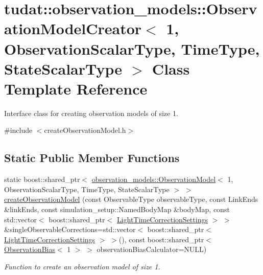 \hypertarget{classtudat_1_1observation__models_1_1ObservationModelCreator_3_011_00_01ObservationScalarType_000a796f0b9a7fff0a1600b7fb834d19c2}{}\section{tudat\+:\+:observation\+\_\+models\+:\+:Observation\+Model\+Creator$<$ 1, Observation\+Scalar\+Type, Time\+Type, State\+Scalar\+Type $>$ Class Template Reference}
\label{classtudat_1_1observation__models_1_1ObservationModelCreator_3_011_00_01ObservationScalarType_000a796f0b9a7fff0a1600b7fb834d19c2}


Interface class for creating observation models of size 1.  




{\ttfamily \#include $<$create\+Observation\+Model.\+h$>$}

\subsection*{Static Public Member Functions}
\begin{DoxyCompactItemize}
\item 
static boost\+::shared\+\_\+ptr$<$ \hyperlink{classtudat_1_1observation__models_1_1ObservationModel}{observation\+\_\+models\+::\+Observation\+Model}$<$ 1, Observation\+Scalar\+Type, Time\+Type, State\+Scalar\+Type $>$ $>$ \hyperlink{classtudat_1_1observation__models_1_1ObservationModelCreator_3_011_00_01ObservationScalarType_000a796f0b9a7fff0a1600b7fb834d19c2_ae9fd293adfe7dd20ebe6578b54d14e9d}{create\+Observation\+Model} (const Observable\+Type observable\+Type, const Link\+Ends \&link\+Ends, const simulation\+\_\+setup\+::\+Named\+Body\+Map \&body\+Map, const std\+::vector$<$ boost\+::shared\+\_\+ptr$<$ \hyperlink{classtudat_1_1observation__models_1_1LightTimeCorrectionSettings}{Light\+Time\+Correction\+Settings} $>$ $>$ \&single\+Observable\+Corrections=std\+::vector$<$ boost\+::shared\+\_\+ptr$<$ \hyperlink{classtudat_1_1observation__models_1_1LightTimeCorrectionSettings}{Light\+Time\+Correction\+Settings} $>$ $>$(), const boost\+::shared\+\_\+ptr$<$ \hyperlink{classtudat_1_1observation__models_1_1ObservationBias}{Observation\+Bias}$<$ 1 $>$ $>$ observation\+Bias\+Calculator=N\+U\+LL)
\begin{DoxyCompactList}\small\item\em Function to create an observation model of size 1. \end{DoxyCompactList}\end{DoxyCompactItemize}


